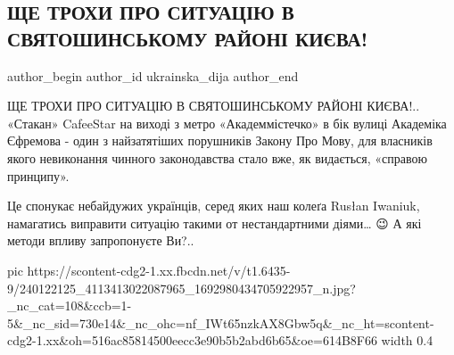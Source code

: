  
 
 
 
 
 
\subsection{ЩЕ ТРОХИ ПРО СИТУАЦІЮ В СВЯТОШИНСЬКОМУ РАЙОНІ КИЄВА!}
\label{sec:20_08_2021.fb.ukrainska_dija.1.mova_zakon_kafe}
 
\ifcmt
 author_begin
   author_id ukrainska_dija
 author_end
\fi

ЩЕ ТРОХИ ПРО СИТУАЦІЮ В СВЯТОШИНСЬКОМУ РАЙОНІ КИЄВА!.. «Стакан» CafeeStar на
виході з метро «Академмістечко» в бік вулиці Академіка Єфремова - один з
найзатятіших порушників Закону Про Мову, для власників якого невиконання
чинного законодавства стало вже, як видається, «справою принципу».

Це спонукає небайдужих українців, серед яких наш колеґа Rusłan Iwaniuk,
намагатись виправити ситуацію такими от нестандартними діями… 😉 А які методи
впливу запропонуєте Ви?..

\ifcmt
  pic https://scontent-cdg2-1.xx.fbcdn.net/v/t1.6435-9/240122125_4113413022087965_1692980434705922957_n.jpg?_nc_cat=108&ccb=1-5&_nc_sid=730e14&_nc_ohc=nf_IWt65nzkAX8Gbw5q&_nc_ht=scontent-cdg2-1.xx&oh=516ac85814500eecc3e90b5b2abd6b65&oe=614B8F66
  width 0.4
\fi
